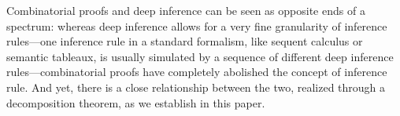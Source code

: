 \documentclass[conference,twosided,10pt]{IEEEtran}
\theoremstyle{definition}
\begin{document}
Combinatorial proofs and deep inference can be seen as opposite ends
of a spectrum: whereas deep inference allows for a very fine
granularity of inference rules---one inference rule in a standard
formalism, like sequent calculus or semantic tableaux, is usually
simulated by a sequence of different deep inference
rules---combinatorial proofs have completely abolished the concept of
inference rule. And yet, there is a close relationship between the
two, realized through a decomposition theorem, as we establish in this
paper.



% 
% 






\end{document}
